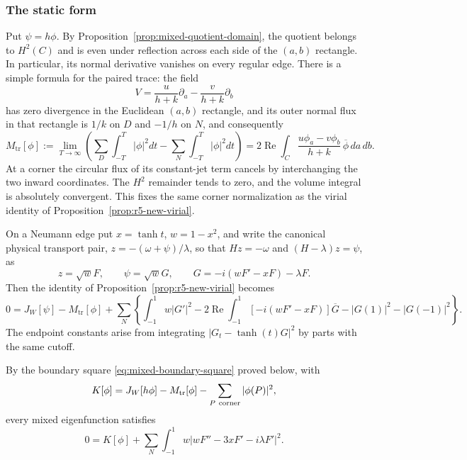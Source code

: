 \documentclass[reqno,11pt]{amsart}
\numberwithin{equation}{section}
\theoremstyle{remark}
\begin{document}
\subsubsection{The static form}

Put $\psi=h\phi$. By Proposition~\ref{prop:mixed-quotient-domain},
the quotient belongs to $H^2(C)$ and is even
under reflection across each side of the $(a,b)$ rectangle. In particular,
its normal derivative vanishes on every regular edge. There is a simple
formula for the paired trace: the field
\[
 V=\frac{u}{h+k}\partial_a-\frac{v}{h+k}\partial_b
\]
has zero divergence in the Euclidean $(a,b)$ rectangle, and its
outer normal flux in that rectangle is $1/k$ on $D$ and $-1/h$ on $N$,
and consequently
\[
 M_{\mathrm{tr}}[\phi]:=\lim_{T\to\infty}
   \left(\sum_D\int_{-T}^{T}|\phi|^2dt
                -\sum_N\int_{-T}^{T}|\phi|^2dt\right)
 =2\operatorname{Re}\int_C
       \frac{u\phi_a-v\phi_b}{h+k}\,\overline\phi\,da\,db.
\]
At a corner the circular flux of its constant-jet term cancels by
interchanging the two inward coordinates. The $H^2$ remainder tends to
zero, and the volume integral is absolutely convergent. This fixes the
same corner normalization as the virial identity of
Proposition~\ref{prop:r5-new-virial}.

On a Neumann edge put $x=\tanh t$, $w=1-x^2$, and write the canonical
physical transport pair,
$z=-(\omega+\psi)/\lambda$, so that $Hz=-\omega$ and $(H-\lambda)z=\psi$, as
\[
 z=\sqrt w F,\qquad \psi=\sqrt w G,\qquad
 G=-i(wF'-xF)-\lambda F.
\]
Then the identity of Proposition~\ref{prop:r5-new-virial} becomes
\[
 0=J_W[\psi]-M_{\mathrm{tr}}[\phi]+\sum_N
 \left\{\int_{-1}^1 w|G'|^2
 -2\operatorname{Re}\int_{-1}^1[-i(wF'-xF)]\overline G
 -|G(1)|^2-|G(-1)|^2\right\}.
\]
The endpoint constants arise from integrating
$|G_t-\tanh(t)G|^2$ by parts with the same cutoff.

By the boundary square \eqref{eq:mixed-boundary-square} proved below,
with
\[
 K[\phi]=J_W[h\phi]-M_{\mathrm{tr}}[\phi]
                   -\sum_{P\ {\rm corner}}|\phi(P)|^2,
\]
every mixed eigenfunction satisfies
\begin{equation}\label{eq:mixed-K-identity}
 0=K[\phi]+\sum_N\int_{-1}^1
                   w|wF''-3xF'-i\lambda F'|^2.
\end{equation}
\end{document}
